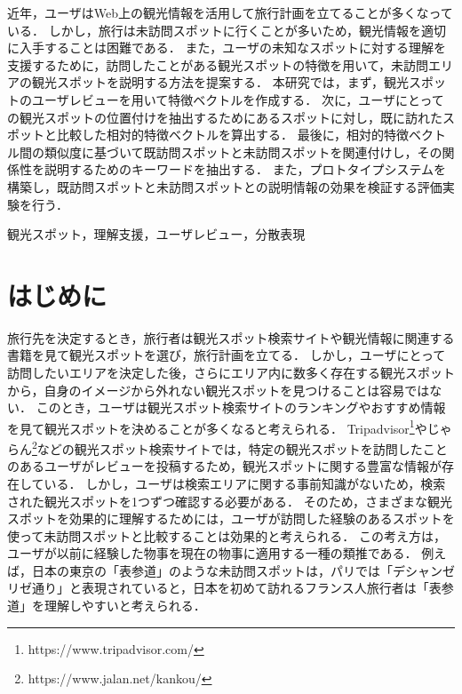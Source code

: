 \documentclass{deimj}
\begin{document}
\pagestyle{empty}
\begin{jabstract}
近年，ユーザはWeb上の観光情報を活用して旅行計画を立てることが多くなっている．
しかし，旅行は未訪問スポットに行くことが多いため，観光情報を適切に入手することは困難である．
また，ユーザの未知なスポットに対する理解を支援するために，訪問したことがある観光スポットの特徴を用いて，未訪問エリアの観光スポットを説明する方法を提案する．
本研究では，まず，観光スポットのユーザレビューを用いて特徴ベクトルを作成する．
次に，ユーザにとっての観光スポットの位置付けを抽出するためにあるスポットに対し，既に訪れたスポットと比較した相対的特徴ベクトルを算出する．
最後に，相対的特徴ベクトル間の類似度に基づいて既訪問スポットと未訪問スポットを関連付けし，その関係性を説明するためのキーワードを抽出する．
また，プロトタイプシステムを構築し，既訪問スポットと未訪問スポットとの説明情報の効果を検証する評価実験を行う．
\end{jabstract}

\begin{jkeyword}
観光スポット，理解支援，ユーザレビュー，分散表現
\end{jkeyword}
\maketitle

\section{はじめに}
\label{sec:はじめに}
旅行先を決定するとき，旅行者は観光スポット検索サイトや観光情報に関連する書籍を見て観光スポットを選び，旅行計画を立てる．
しかし，ユーザにとって訪問したいエリアを決定した後，さらにエリア内に数多く存在する観光スポットから，自身のイメージから外れない観光スポットを見つけることは容易ではない．
このとき，ユーザは観光スポット検索サイトのランキングやおすすめ情報を見て観光スポットを決めることが多くなると考えられる．
Tripadvisor\footnote{https://www.tripadvisor.com/}やじゃらん\footnote{https://www.jalan.net/kankou/}などの観光スポット検索サイトでは，特定の観光スポットを訪問したことのあるユーザがレビューを投稿するため，観光スポットに関する豊富な情報が存在している．
しかし，ユーザは検索エリアに関する事前知識がないため，検索された観光スポットを1つずつ確認する必要がある．
そのため，さまざまな観光スポットを効果的に理解するためには，ユーザが訪問した経験のあるスポットを使って未訪問スポットと比較することは効果的と考えられる．
この考え方は，ユーザが以前に経験した物事を現在の物事に適用する一種の類推である．
例えば，日本の東京の「表参道」のような未訪問スポットは，パリでは「デシャンゼリゼ通り」と表現されていると，日本を初めて訪れるフランス人旅行者は「表参道」を理解しやすいと考えられる．
\end{document}
